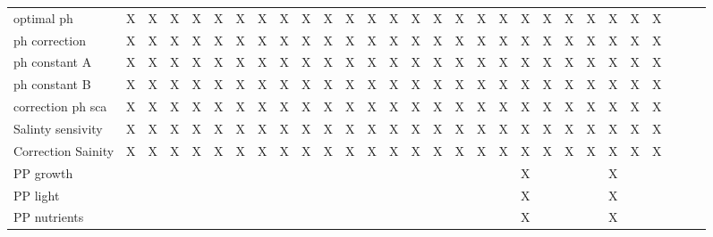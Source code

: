 \documentclass[11pt]{article}
\begin{document}
\begin{center}
\begin{tabular}{lllllllllllllllllllllllllllll}
 optimal ph          &  X    &  X    &  X    &  X    &  X    &  X    &  X    &  X    &  X    &  X    &  X    &  X    &  X    &  X    &  X    &  X    &  X    &  X    &  X    &  X    &  X    &  X   &  X   &  X    &  X    &      &      &      \\
 ph correction       &  X    &  X    &  X    &  X    &  X    &  X    &  X    &  X    &  X    &  X    &  X    &  X    &  X    &  X    &  X    &  X    &  X    &  X    &  X    &  X    &  X    &  X   &  X   &  X    &  X    &      &      &      \\
 ph constant A       &  X    &  X    &  X    &  X    &  X    &  X    &  X    &  X    &  X    &  X    &  X    &  X    &  X    &  X    &  X    &  X    &  X    &  X    &  X    &  X    &  X    &  X   &  X   &  X    &  X    &      &      &      \\
 ph constant B       &  X    &  X    &  X    &  X    &  X    &  X    &  X    &  X    &  X    &  X    &  X    &  X    &  X    &  X    &  X    &  X    &  X    &  X    &  X    &  X    &  X    &  X   &  X   &  X    &  X    &      &      &      \\
 correction ph sca   &  X    &  X    &  X    &  X    &  X    &  X    &  X    &  X    &  X    &  X    &  X    &  X    &  X    &  X    &  X    &  X    &  X    &  X    &  X    &  X    &  X    &  X   &  X   &  X    &  X    &      &      &      \\
 Salinty sensivity   &  X    &  X    &  X    &  X    &  X    &  X    &  X    &  X    &  X    &  X    &  X    &  X    &  X    &  X    &  X    &  X    &  X    &  X    &  X    &  X    &  X    &  X   &  X   &  X    &  X    &      &      &      \\
 Correction Sainity  &  X    &  X    &  X    &  X    &  X    &  X    &  X    &  X    &  X    &  X    &  X    &  X    &  X    &  X    &  X    &  X    &  X    &  X    &  X    &  X    &  X    &  X   &  X   &  X    &  X    &      &      &      \\
 PP growth           &       &       &       &       &       &       &       &       &       &       &       &       &       &       &       &       &       &       &  X    &       &       &      &  X   &       &       &      &      &      \\
 PP light            &       &       &       &       &       &       &       &       &       &       &       &       &       &       &       &       &       &       &  X    &       &       &      &  X   &       &       &      &      &      \\
 PP nutrients        &       &       &       &       &       &       &       &       &       &       &       &       &       &       &       &       &       &       &  X    &       &       &      &  X   &       &       &      &      &      \\

\end{tabular}
\end{center}
\end{document}
